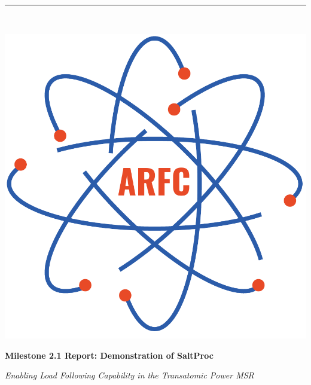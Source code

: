 \documentclass[12pt]{article} %
\begin{document}

\begin{titlepage} %
    \newcommand{\HRule}{\rule{\linewidth}{0.5mm}} %
    
    \center %

    
    \HRule\\[0.2cm]
    
     \begin{minipage}{0.4\textwidth}
        \includegraphics[width=\textwidth]{arfc-logo}
        \end{minipage}%
        \begin{minipage}{0.6\textwidth}
        {\begin{flushright}\huge\bfseries Milestone 2.1 Report: Demonstration of SaltProc\end{flushright}}
        {\begin{flushright}\large\textit{Enabling Load Following Capability in the Transatomic Power MSR}\end{flushright}}


\end{minipage}
\end{titlepage}
\end{document}
